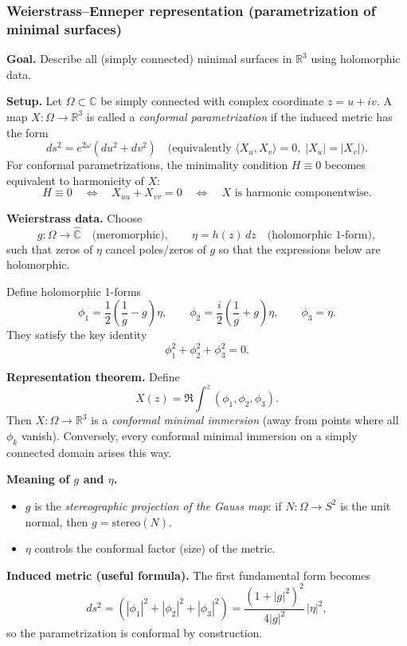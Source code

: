 \documentclass[12pt,a4paper]{article}
\theoremstyle{plain}
\theoremstyle{definition}      %
\begin{document}
	\subsubsection*{Weierstrass--Enneper representation (parametrization of minimal surfaces)}
	
	\textbf{Goal.} Describe all (simply connected) minimal surfaces in $\mathbb{R}^3$ using holomorphic data.
	
	\medskip
	\textbf{Setup.}
	Let $\Omega\subset\mathbb{C}$ be simply connected with complex coordinate $z=u+iv$.
	A map $X:\Omega\to\mathbb{R}^3$ is called a \emph{conformal parametrization} if the induced metric has the form
	\[
	ds^2 = e^{2\omega}(du^2+dv^2)
	\quad\text{(equivalently } \langle X_u,X_v\rangle=0,\; |X_u|=|X_v|\text{)}.
	\]
	For conformal parametrizations, the minimality condition $H\equiv 0$ becomes equivalent to harmonicity of $X$:
	\[
	H\equiv 0 \quad\Longleftrightarrow\quad X_{uu}+X_{vv}=0
	\quad\Longleftrightarrow\quad X \text{ is harmonic componentwise.}
	\]
	
	\medskip
	\textbf{Weierstrass data.}
	Choose
	\[
	g:\Omega\to\widehat{\mathbb{C}} \quad\text{(meromorphic)},\qquad
	\eta = h(z)\,dz \quad\text{(holomorphic 1-form)},
	\]
	such that zeros of $\eta$ cancel poles/zeros of $g$ so that the expressions below are holomorphic.
	
	Define holomorphic 1-forms
	\[
	\phi_1=\frac12\left(\frac{1}{g}-g\right)\eta,\qquad
	\phi_2=\frac{i}{2}\left(\frac{1}{g}+g\right)\eta,\qquad
	\phi_3=\eta.
	\]
	They satisfy the key identity
	\[
	\phi_1^2+\phi_2^2+\phi_3^2=0.
	\]
	
	\medskip
	\textbf{Representation theorem.}
	Define
	\[
	X(z)=\Re\int^z (\phi_1,\phi_2,\phi_3).
	\]
	Then $X:\Omega\to\mathbb{R}^3$ is a \emph{conformal minimal immersion} (away from points where all $\phi_k$ vanish).
	Conversely, every conformal minimal immersion on a simply connected domain arises this way.
	
	\medskip
	\textbf{Meaning of $g$ and $\eta$.}
	\begin{itemize}
		\item $g$ is the \emph{stereographic projection of the Gauss map}:
		if $N:\Omega\to S^2$ is the unit normal, then $g=\mathrm{stereo}(N)$.
		\item $\eta$ controls the conformal factor (size) of the metric.
	\end{itemize}
	
	\medskip
	\textbf{Induced metric (useful formula).}
	The first fundamental form becomes
	\[
	ds^2 = \left(|\phi_1|^2+|\phi_2|^2+|\phi_3|^2\right)
	= \frac{(1+|g|^2)^2}{4|g|^2}\,|\eta|^2,
	\]
	so the parametrization is conformal by construction.
	
\end{document}
